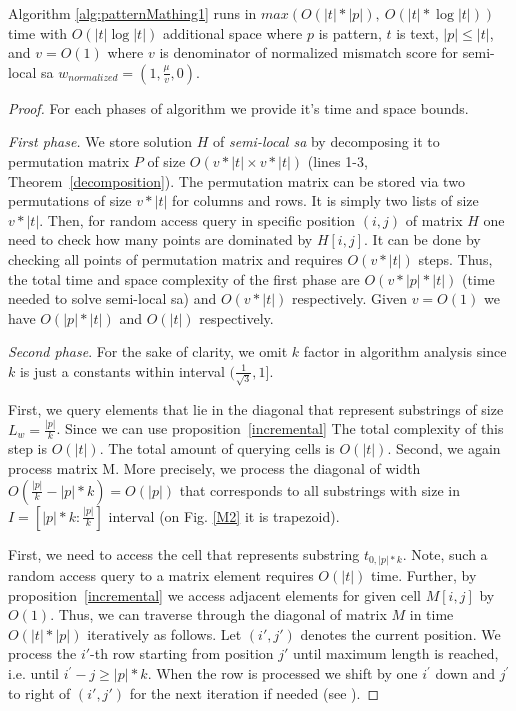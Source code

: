 \begin{theorem}
Algorithm \ref{alg:patternMathing1} runs in $max(O(|t|*|p|),\ O(|t| * \log |t|))$ time with $O( |t| \log |t|)$ additional space where $p$ is pattern, $t$ is text, $|p| \leq |t|$, and $v=O(1)$ where $v$ is denominator of normalized mismatch score for semi-local sa $w_{normalized} = (1,\frac{\mu}{v},0)$.
\end{theorem}
\begin{proof}
  For each phases of algorithm we provide it's time and space bounds.
  
\emph{First phase.}
We store solution $H$ of \emph{semi-local sa} by decomposing it to permutation matrix $P$ of size $O(v*|t| \times v*|t|)$ (lines 1-3, Theorem~\ref{decomposition}).
The permutation matrix can be stored via two permutations of size $v*|t|$ for columns and rows.
It is simply two lists of size $v*|t|$.
Then, for random access query in specific position $(i,j)$ of matrix $H$ one need to check how many points are dominated by $H [i,j]$.
It can be done by checking all points of permutation matrix and requires $O(v * |t|)$ steps.
Thus, the total time and space complexity of the first phase are $O(v *|p| * |t|)$ (time needed to solve semi-local sa) and $O(v*|t|)$ respectively.
Given $v=O(1)$ we have $O(|p| * |t|)$ and $O(|t|)$ respectively.

\emph{Second phase}.
For the sake of clarity, we omit $k$ factor in algorithm analysis since $k$ is just a constants within interval $(\frac{1}{\sqrt{3}},1]$.

First, we query elements that lie in the diagonal that represent
substrings of size $L_{w}=\frac{|p|}{k}$.
Since we can use proposition~\ref{incremental}
The total complexity of this step is $O(|t|)$.
The total amount of querying cells is $O(|t|)$. 
Second, we again process matrix M.
More precisely, we process the diagonal of width $O(\frac{|p|}{k}-|p|*k)=O(|p|)$ that corresponds to all substrings with size in  $I=[|p|*k:\frac{|p|}{k}]$ interval (on Fig. \ref{M2} it is  trapezoid). 

First, we need to access the cell that represents substring $t_{0,|p|*k}$.
Note, such a random access query to a matrix element requires $O(|t|)$ time.
Further, by  proposition~\ref{incremental} we access adjacent elements for given cell $M[i,j]$ by $O(1)$.
Thus, we can traverse through the diagonal of matrix $M$ in time $O(|t|*|p|)$ iteratively as follows.
Let $(i',j')$ denotes the current position.
We process the $i'$-th row starting from position $j'$ until maximum length is reached, i.e. until $i^{'}-j \geq |p|*k$.
When the row is processed we shift by one $i^{'}$ down and $j^{'}$ to right of $(i',j')$ for the next iteration if needed (see  ).


\end{proof}
